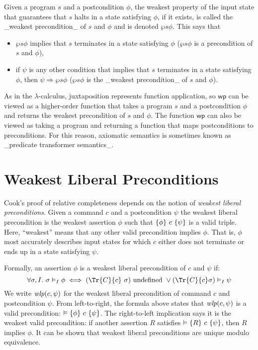 Given a program $s$ and a postcondition $\phi$, the weakest property
of the input state that guarantees that $s$ halts in a state
satisfying $\phi$, if it exists, is called the _weakest precondition_
of $s$ and $\phi$ and is denoted $\wp s\phi$.  This says that
\begin{itemize}
\item
$\wp s\phi$ implies that $s$ terminates in a state satisfying $\phi$ ($\wp s\phi$ is a precondition of $s$ and $\phi$),
\item
if $\psi$ is any other condition that implies that $s$ terminates in a state satisfying $\phi$, then $\psi\Rightarrow\wp s\phi$ ($\wp s\phi$ is the _weakest precondition_ of $s$ and $\phi$).
\end{itemize}

As in the $\lambda$-calculus, juxtaposition represents function
application, so $\mathsf{wp}$ can be viewed as a higher-order function
that takes a program $s$ and a postcondition $\phi$ and returns the
weakest precondition of $s$ and $\phi$.  The function $\mathsf{wp}$
can also be viewed as taking a program and returning a function that
maps postconditions to preconditions. For this reason, axiomatic
semantics is sometimes known as _predicate transformer semantics_.

\section{Weakest Liberal Preconditions}

Cook's proof of relative completeness depends on the notion of
\emph{weakest liberal preconditions}. Given a command $c$ and a
postcondition $\psi$ the weakest liberal precondition is the weakest
assertion $\phi$ such that \(\{ \phi \}{~}c{~}\{ \psi \}\) is a valid triple. Here,
``weakest'' means that any other valid precondition implies $\phi$. That
is, $\phi$ most accurately describes input states for which $c$ either
does not terminate or ends up in a state satisfying $\psi$.

Formally, an assertion $\phi$ is a weakest liberal precondition of $c$
and $\psi$ if:
%
\[
\forall \sigma, I.~ \sigma \vDash_I \phi \iff (\Tr{C}{c}~\sigma) 
\text{ undefined } \vee (\Tr{C}{c} \sigma) \vDash_I \psi
\]
%
We write $\mathit{wlp}(c,\psi)$ for the weakest liberal precondition of command
$c$ and postcondition $\psi$. From left-to-right, the formula above
states that $\mathit{wlp}(c,\psi)$ is a valid precondition: $\vDash
\{ \phi \}{~}c{~}\{ \psi \}$. The right-to-left implication says it is the weakest
valid precondition: if another assertion $R$ satisfies $\vDash
\{ R \}{~}c{~}\{ \psi \}$, then $R$ implies $\phi$.  It can be shown that weakest
liberal preconditions are unique modulo equivalence.

